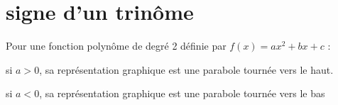 \section{signe d'un trinôme}

    \begin{bintro}
        Pour une fonction polynôme de degré 2 définie par $f(x)=ax^2+bx+c$ :
        \begin{itemRem}
            \item si $a > 0$, sa représentation graphique est une parabole tournée vers le haut.
            \item si $a < 0$, sa représentation graphique est une parabole tournée vers le bas
        \end{itemRem}
    \end{bintro}
    

